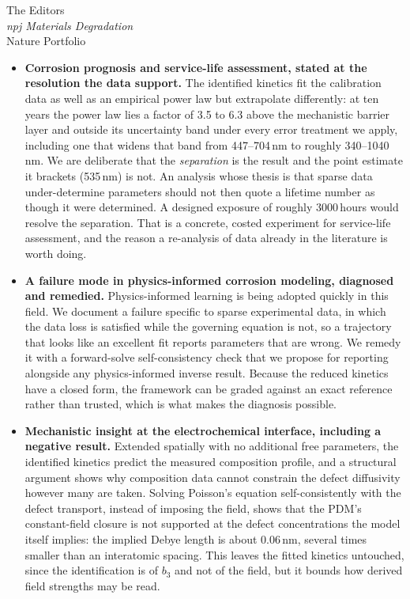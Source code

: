 \documentclass[11pt]{letter}
\begin{document}
\begin{letter}{The Editors \\ \textit{npj Materials Degradation} \\ Nature Portfolio}
\begin{itemize}
\item \textbf{Corrosion prognosis and service-life assessment, stated at
the resolution the data support.} The identified kinetics fit the
calibration data as well as an empirical power law but extrapolate
differently: at ten years the power law lies a factor of 3.5 to 6.3
above the mechanistic barrier layer and outside its uncertainty band
under every error treatment we apply, including one that widens that
band from 447--704\,nm to roughly 340--1040\,nm. We are deliberate that
the \emph{separation} is the result and the point estimate it brackets
(535\,nm) is not. An analysis whose thesis is that sparse data
under-determine parameters should not then quote a lifetime number as
though it were determined. A designed exposure of roughly 3000\,hours
would resolve the separation. That is a concrete, costed experiment for
service-life assessment, and the reason a re-analysis of data already in
the literature is worth doing.

\item \textbf{A failure mode in physics-informed corrosion modeling,
diagnosed and remedied.} Physics-informed learning is being adopted
quickly in this field. We document a failure specific to sparse
experimental data, in which the data loss is satisfied while the
governing equation is not, so a trajectory that looks like an excellent
fit reports parameters that are wrong. We remedy it with a forward-solve
self-consistency check that we propose for reporting alongside any
physics-informed inverse result. Because the reduced kinetics have a
closed form, the framework can be graded against an exact reference
rather than trusted, which is what makes the diagnosis possible.

\item \textbf{Mechanistic insight at the electrochemical interface,
including a negative result.} Extended spatially with no additional free
parameters, the identified kinetics predict the measured composition
profile, and a structural argument shows why composition data cannot
constrain the defect diffusivity however many are taken. Solving
Poisson's equation self-consistently with the defect transport, instead
of imposing the field, shows that the PDM's constant-field closure is
not supported at the defect concentrations the model itself implies: the
implied Debye length is about 0.06\,nm, several times smaller than an
interatomic spacing. This leaves the fitted kinetics untouched, since
the identification is of $b_3$ and not of the field, but it bounds how
derived field strengths may be read.


\end{itemize}
\end{letter}
\end{document}
